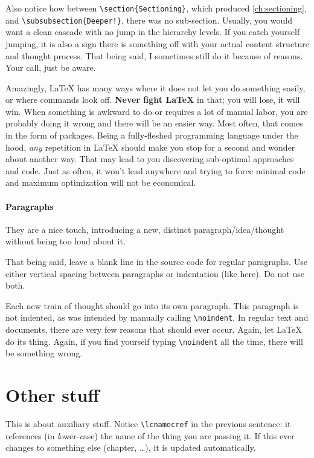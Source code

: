 Also notice how between \verb|\section{Sectioning}|, which produced \cref{ch:sectioning}, and \verb|\subsubsection{Deeper!}|, there was no sub-section.
Usually, you would want a clean cascade with no jump in the hierarchy levels.
If you catch yourself jumping, it is also a sign there is something off with your actual content structure and thought process.
That being said, I sometimes still do it because of reasons.
Your call, just be aware.

Amazingly, \LaTeX{} has many ways where it does not let you do something easily, or where commands look off.
\textbf{Never fight \LaTeX{}} in that; you will lose, it will win.
When something is awkward to do or requires a lot of manual labor, you are probably doing it wrong and there will be an easier way.
Most often, that comes in the form of packages.
Being a fully-fleshed programming language under the hood, \emph{any} repetition in \LaTeX{} should make you stop for a second and wonder about another way.
That may lead to you discovering sub-optimal approaches and code.
Just as often, it won't lead anywhere and trying to force minimal code and maximum optimization will not be economical.

\paragraph{Paragraphs}
They are a nice touch, introducing a new, distinct paragraph/idea/thought without being too loud about it.

That being said, leave a blank line in the source code for regular paragraphs.
Use either vertical spacing between paragraphs or indentation (like here).
Do not use both.

\noindent Each new train of thought should go into its own paragraph.
This paragraph is not indented, as was intended by manually calling \verb|\noindent|.
In regular text and documents, there are very few reasons that should ever occur.
Again, let \LaTeX{} do its thing.
Again, if you find yourself typing \verb|\noindent| all the time, there will be something wrong.

\section{Other stuff}\label{ch:other_stuff}
This \textcolor{mRed}{} is about auxiliary stuff.
Notice \color{mRed} \verb|\lcnamecref| \color{black} in the previous sentence: it references (in \textit{l}ower-\textit{c}ase) the name of the thing you are passing it.
If this  ever changes to something else (chapter, \dots), it is updated automatically.

